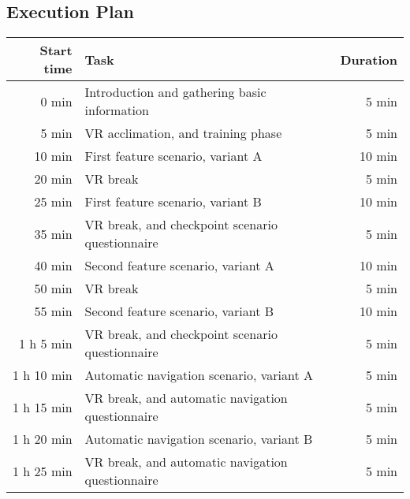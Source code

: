 \subsection{Execution Plan}\label{subsec:execution-plan}

\begin{center}
    \begin{tabular}{r l r}
        \toprule
        \textbf{Start time} & \textbf{Task} & \textbf{Duration} \\
        \midrule
             0 min & Introduction and gathering basic information     &  5 min \\
             5 min & VR acclimation, and training phase               &  5 min \\
        \midrule
            10 min & First feature scenario, variant A                & 10 min \\
            20 min & VR break                                         &  5 min \\
            25 min & First feature scenario, variant B                & 10 min \\
            35 min & VR break, and checkpoint scenario questionnaire  &  5 min \\
        \midrule
            40 min & Second feature scenario, variant A               & 10 min \\
            50 min & VR break                                         &  5 min \\
            55 min & Second feature scenario, variant B               & 10 min \\
        1 h  5 min & VR break, and checkpoint scenario questionnaire  &  5 min \\
        \midrule
        1 h 10 min & Automatic navigation scenario, variant A         &  5 min \\
        1 h 15 min & VR break, and automatic navigation questionnaire &  5 min \\
        1 h 20 min & Automatic navigation scenario, variant B         &  5 min \\
        1 h 25 min & VR break, and automatic navigation questionnaire &  5 min \\
        \bottomrule
    \end{tabular}
    \label{tab:execution-plan}
\end{center}

